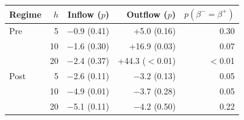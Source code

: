 \begin{tabular}{lrrrr}
\toprule
Regime & $h$ & Inflow ($p$) & Outflow ($p$) & $p(\beta^-{=}\beta^+)$ \\
\midrule
Pre & 5 & \ensuremath{-}0.9 (0.41) & +5.0 (0.16) & 0.30 \\
 & 10 & \ensuremath{-}1.6 (0.30) & +16.9 (0.03) & 0.07 \\
 & 20 & \ensuremath{-}2.4 (0.37) & +44.3 ($<$0.01) & $<$0.01 \\
\midrule
Post & 5 & \ensuremath{-}2.6 (0.11) & \ensuremath{-}3.2 (0.13) & 0.05 \\
 & 10 & \ensuremath{-}4.9 (0.01) & \ensuremath{-}3.7 (0.28) & 0.05 \\
 & 20 & \ensuremath{-}5.1 (0.11) & \ensuremath{-}4.2 (0.50) & 0.22 \\
\bottomrule
\end{tabular}
